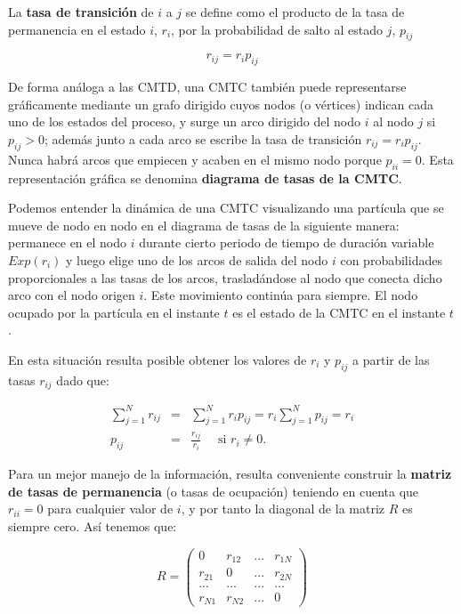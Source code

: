 \documentclass[
]{book}
\theoremstyle{definition}
\theoremstyle{definition}
\theoremstyle{definition}
\theoremstyle{definition}
\theoremstyle{remark}
\begin{document}
La \textbf{tasa de transición} de \(i\) a \(j\) se define como el producto de la tasa de permanencia en el estado \(i\), \(r_i\), por la probabilidad de salto al estado \(j\), \(p_{ij}\)

\begin{equation}
r_{ij} = r_i p_{ij}
\end{equation}

De forma análoga a las CMTD, una CMTC también puede representarse gráficamente mediante un grafo dirigido cuyos nodos (o vértices) indican cada uno de los estados del proceso, y surge un arco dirigido del nodo \(i\) al nodo \(j\) si \(p_{ij} > 0\); además junto a cada arco se escribe la tasa de transición \(r_{ij} = r_i p_{ij}\). Nunca habrá arcos que empiecen y acaben en el mismo nodo porque \(p_{ii}=0\). Esta representación gráfica se denomina \textbf{diagrama de tasas de la CMTC}.

Podemos entender la dinámica de una CMTC visualizando una partícula que se mueve de nodo en nodo en el diagrama de tasas de la siguiente manera: permanece en el nodo \(i\) durante cierto periodo de tiempo de duración variable \(Exp(r_i)\) y luego elige uno de los arcos de salida del nodo \(i\) con probabilidades proporcionales a las tasas de los arcos, trasladándose al nodo que conecta dicho arco con el nodo origen \(i\). Este movimiento continúa para siempre. El nodo ocupado por la partícula en el instante \(t\) es el estado de la CMTC en el instante \(t\).

En esta situación resulta posible obtener los valores de \(r_i\) y \(p_{ij}\) a partir de las tasas \(r_{ij}\) dado que:

\begin{eqnarray*}
\sum_{j=1}^{N} r_{ij} &=& \sum_{j=1}^{N} r_i p_{ij} = r_i \sum_{j=1}^{N} p_{ij} = r_i\\
p_{ij} &=& \frac{r_{ij}}{r_i} \quad \text{ si } r_i \neq 0.
\end{eqnarray*}

Para un mejor manejo de la información, resulta conveniente construir la \textbf{matriz de tasas de permanencia} (o tasas de ocupación) teniendo en cuenta que \(r_{ii} = 0\) para cualquier valor de \(i\), y por tanto la diagonal de la matriz \(R\) es siempre cero. Así tenemos que:

\[R = 
\begin{pmatrix}
0 & r_{12} & ... & r_{1N}\\
r_{21} & 0 & ... & r_{2N}\\
... & ... & ... & ...\\
r_{N1} & r_{N2} & ... & 0
\end{pmatrix}\]
\end{document}
